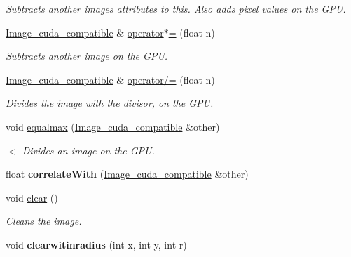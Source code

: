\begin{DoxyCompactItemize}
\begin{DoxyCompactList}\small\item\em Subtracts another image\textquotesingle{}s attributes to this. Also adds pixel values on the G\+PU. \end{DoxyCompactList}\item 
\hyperlink{classImage__cuda__compatible}{Image\+\_\+cuda\+\_\+compatible} \& \hyperlink{classImage__cuda__compatible_adc2d6a2df6470bf1914a1fd2b0a0e49a}{operator$\ast$=} (float n)
\begin{DoxyCompactList}\small\item\em Subtracts another image on the G\+PU. \end{DoxyCompactList}\item 
\hyperlink{classImage__cuda__compatible}{Image\+\_\+cuda\+\_\+compatible} \& \hyperlink{classImage__cuda__compatible_a9ad71725876a14435f64da690950ecd3}{operator/=} (float n)\hypertarget{classImage__cuda__compatible_a9ad71725876a14435f64da690950ecd3}{}\label{classImage__cuda__compatible_a9ad71725876a14435f64da690950ecd3}

\begin{DoxyCompactList}\small\item\em Divides the image with the divisor, on the G\+PU. \end{DoxyCompactList}\item 
void \hyperlink{classImage__cuda__compatible_af5e98d953c3591fe504462e1c1494e19}{equalmax} (\hyperlink{classImage__cuda__compatible}{Image\+\_\+cuda\+\_\+compatible} \&other)\hypertarget{classImage__cuda__compatible_af5e98d953c3591fe504462e1c1494e19}{}\label{classImage__cuda__compatible_af5e98d953c3591fe504462e1c1494e19}

\begin{DoxyCompactList}\small\item\em $<$ Divides an image on the G\+PU. \end{DoxyCompactList}\item 
float {\bfseries correlate\+With} (\hyperlink{classImage__cuda__compatible}{Image\+\_\+cuda\+\_\+compatible} \&other)\hypertarget{classImage__cuda__compatible_a4ddd4869962e4e11eb3937ffb9c5507e}{}\label{classImage__cuda__compatible_a4ddd4869962e4e11eb3937ffb9c5507e}

\item 
void \hyperlink{classImage__cuda__compatible_a99093177f959aeee51732f403be8819e}{clear} ()
\begin{DoxyCompactList}\small\item\em Cleans the image. \end{DoxyCompactList}\item 
void {\bfseries clearwitinradius} (int x, int y, int r)\hypertarget{classImage__cuda__compatible_ab42d33bbe730d570d4db87e911966726}{}\label{classImage__cuda__compatible_ab42d33bbe730d570d4db87e911966726}


\end{DoxyCompactItemize}
